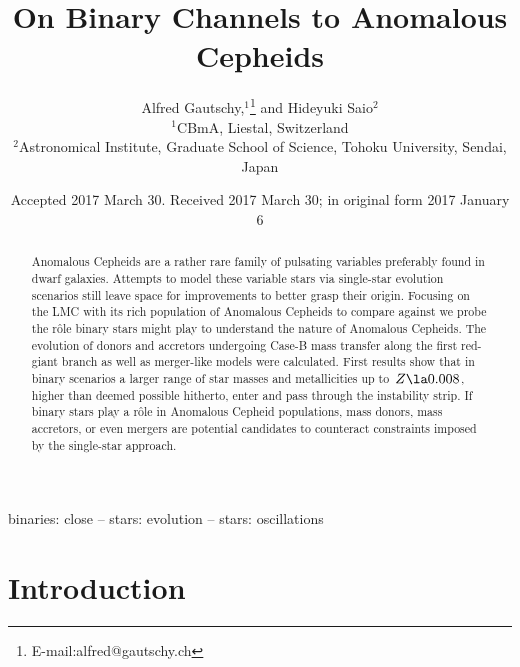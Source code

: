 \documentclass[a4paper,fleqn,usenatbib]{mnras}
\title[]{On  Binary Channels to Anomalous Cepheids}
\author[A. Gautschy and H. Saio]{
Alfred Gautschy,$^{1}$\thanks{E-mail:alfred@gautschy.ch}
and Hideyuki Saio$^{2}$
\\
$^{1}$CBmA, Liestal, Switzerland\\
$^{2}$Astronomical Institute, Graduate School of Science, Tohoku University, Sendai, Japan\\
}
\date{Accepted 2017 March 30. Received 2017 March 30; 
      in original form 2017 January 6}
\begin{document}
\label{firstpage}
\pagerange{\pageref{firstpage}--\pageref{lastpage}}
\maketitle

\begin{abstract}
  Anomalous Cepheids are a rather rare family of pulsating variables
  preferably found in dwarf galaxies. Attempts to model these variable
  stars via single-star evolution scenarios still leave space for
  improvements to better grasp their origin.  Focusing on the LMC with
  its rich population of Anomalous Cepheids to compare against we
  probe the r\^ole binary stars might play to understand the nature of
  Anomalous Cepheids. The evolution of donors and accretors undergoing
  Case-B mass transfer along the first red-giant branch as well as
  merger-like models were calculated. First results show that in
  binary scenarios a larger range of star masses and metallicities up
  to~$Z\la 0.008$, higher than deemed possible hitherto, enter and
  pass through the instability strip. If binary stars play a r\^ole in
  Anomalous Cepheid populations, mass donors, mass accretors, or even
  mergers are potential candidates to counteract constraints imposed
  by the single-star approach.
\end{abstract}

\begin{keywords}
binaries: close -- stars: evolution -- stars: oscillations  
\end{keywords}

\section{Introduction}
\end{document}
